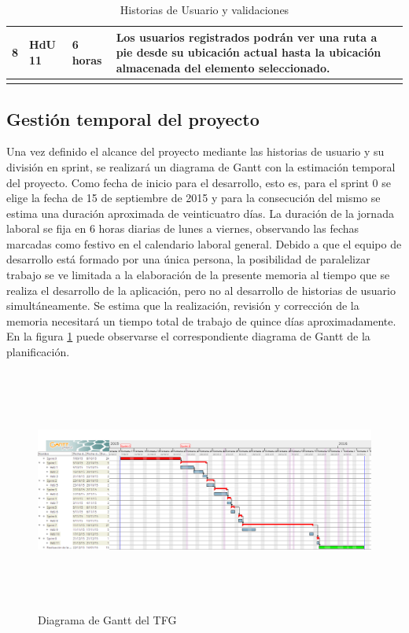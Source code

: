 \begin{longtable}{p{1cm} p{4cm} p{4cm} p{6cm}}
	8	& HdU 11	&	6 horas		&	Los usuarios registrados podrán ver una ruta a pie desde su ubicación actual hasta la ubicación 											almacenada del elemento seleccionado. \\

	\hline
	\caption{Historias de Usuario y validaciones}
	\label{tab:validaciones_HdU}
\end{longtable}

	\subsection{Gestión temporal del proyecto}
	Una vez definido el alcance del proyecto mediante las historias de usuario y su división en sprint, se realizará un diagrama de Gantt con la estimación temporal del proyecto.
	Como fecha de inicio para el desarrollo, esto es, para el sprint 0 se elige la fecha de 15 de septiembre de 2015 y para la consecución del mismo se estima una duración aproximada de veinticuatro días. La duración de la jornada laboral se fija en 6 horas diarias de lunes a viernes, observando las fechas marcadas como festivo en el calendario laboral general.
	Debido a que el equipo de desarrollo está formado por una única persona, la posibilidad de paralelizar trabajo se ve limitada a la elaboración de la presente memoria al tiempo que se realiza el desarrollo de la aplicación, pero no al desarrollo de historias de usuario simultáneamente.
	Se estima que la realización, revisión y corrección de la memoria necesitará un tiempo total de trabajo de quince días aproximadamente.
	En la figura \ref{fig:gantt} puede observarse el correspondiente diagrama de Gantt de la planificación.

\begin{figure}
	\includegraphics[height=80mm, fbox={\fboxrule} 4mm]{./images/05-resultados/01-gantt.png}
	\caption{Diagrama de Gantt del \ac{TFG}}
	\label{fig:gantt}
\end{figure}
	
